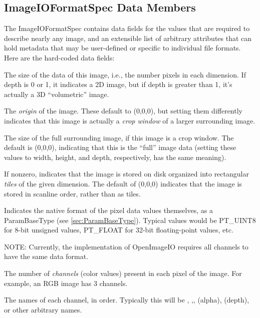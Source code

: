 \subsection{{\kw ImageIOFormatSpec} Data Members}

The {\kw ImageIOFormatSpec} contains data fields for the values that are
required to describe nearly any image, and an extensible list of
arbitrary attributes that can hold metadata that may be user-defined or
specific to individual file formats.  Here are the hard-coded data
fields:

The size of the data of this image, i.e., the number pixels in each
dimension.  If {\kw depth} is 0 or 1, it indicates a 2D image, but if
{\kw depth} is greater than 1, it's actually a 3D ``volumetric'' image.
\apiend

The \emph{origin} of the image.  These default to (0,0,0), but setting
them differently indicates that this image is actually a \emph{crop window}
of a larger surrounding image.
\apiend

The size of the full surrounding image, if this image is a crop window.
The default is (0,0,0), indicating that this is the ``full'' image data
(setting these values to {\kw width}, {\kw height}, and {\kw depth},
respectively, has the same meaning).
\apiend

If nonzero, indicates that the image is stored on disk organized into
rectangular \emph{tiles} of the given dimension.  The default of 
(0,0,0) indicates that the image is stored in scanline order, rather
than as tiles.
\apiend

Indicates the native format of the pixel data values themselves, as a 
{\kw ParamBaseType} (see \ref{sec:ParamBaseType}).  Typical values would be
{\kw PT_UINT8} for 8-bit unsigned values, {\kw PT_FLOAT} for 32-bit
floating-point values, etc.

\noindent NOTE: Currently, the implementation of OpenImageIO requires
all channels to have the same data format.
\apiend

The number of \emph{channels} (color values) present in each pixel of
the image.  For example, an RGB image has 3 channels.
\apiend

The names of each channel, in order.  Typically this will be ,
,,  (alpha),  (depth), or other arbitrary
names.
\apiend

